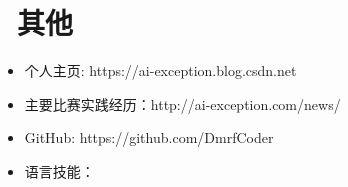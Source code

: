 \documentclass{resume}
\begin{document}


\section{\faInfo\ 其他}
\begin{itemize}[parsep=0.5ex]
  \item 个人主页: https://ai-exception.blog.csdn.net
  \item 主要比赛实践经历：http://ai-exception.com/news/
  \item GitHub: https://github.com/DmrfCoder
  
  \item 语言技能：
\end{itemize}

%
%
\end{document}
